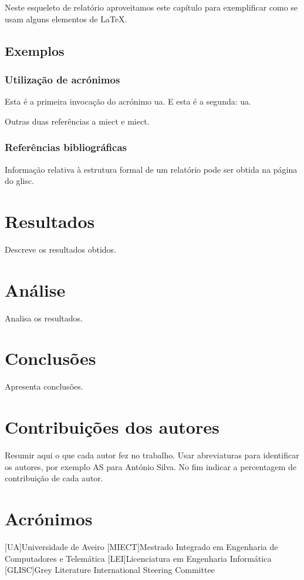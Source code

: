\documentclass{report}
\begin{document}
Neste esqueleto de relatório aproveitamos este capítulo para exemplificar
como se usam alguns elementos de {\LaTeX}.

\section{Exemplos}

\subsection{Utilização de acrónimos}
Esta é a primeira invocação do acrónimo \ac{ua}.
E esta é a segunda: \ac{ua}.

Outras duas referências a \ac{miect}
e \ac{miect}.

\subsection{Referências bibliográficas}
Informação relativa à estrutura formal de um relatório pode ser obtida
na página do \ac{glisc}\cite{glisc}.

\chapter{Resultados}
\label{chap.resultados}
Descreve os resultados obtidos.

\chapter{Análise}
\label{chap.analise}
Analisa os resultados.

\chapter{Conclusões}
\label{chap.conclusao}
Apresenta conclusões.

\chapter*{Contribuições dos autores}
Resumir aqui o que cada autor fez no trabalho.
Usar abreviaturas para identificar os autores,
por exemplo AS para António Silva.
No fim indicar a percentagem de contribuição de cada autor.

\chapter*{Acrónimos}
\begin{acronym}
[UA]{Universidade de Aveiro}
[MIECT]{Mestrado Integrado em Engenharia de Computadores e Telemática}
[LEI]{Licenciatura em Engenharia Informática}
[GLISC]{Grey Literature International Steering Committee}
\end{acronym}


\printbibliography
\end{document}
